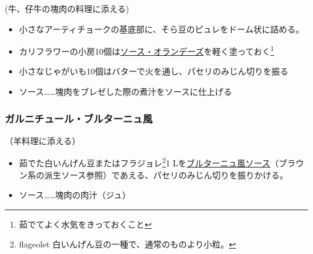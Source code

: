 \begin{recette}
(牛、仔牛の塊肉の料理に添える)

\begin{itemize}
\item
  小さなアーティチョークの基底部に、そら豆のピュレをドーム状に詰める。
\item
  カリフラワーの小房10個は\protect\hyperlink{sauce-hollandaise}{ソース・オランデーズ}を軽く塗っておく\footnote{茹でてよく水気をきっておくこと}
\item
  小さなじゃがいも10個はバターで火を通し、パセリのみじん切りを振る
\item
  ソース\ldots{}\ldots{}塊肉をブレゼした際の煮汁をソースに仕上げる
\end{itemize}

\hypertarget{garniture-bretonne}{%
\subsubsection{ガルニチュール・ブルターニュ風}\label{garniture-bretonne}}



（羊料理に添える）

\begin{itemize}
\item
  茹でた白いんげん豆またはフラジョレ\footnote{flageolet
    白いんげん豆の一種で、通常のものより小粒。}1
  Lを\protect\hyperlink{sauce-bretonne}{ブルターニュ風ソース}（ブラウン系の派生ソース参照）であえる、パセリのみじん切りを振りかける。
\item
  ソース\ldots{}\ldots{}塊肉の肉汁（ジュ）
\end{itemize}

\hypertarget{garniture-brillat-savarin}{%
}
\end{recette}
